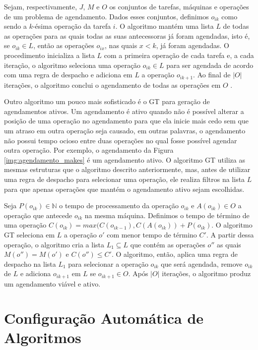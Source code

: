 Sejam, respectivamente, $J$, $M$ e $O$ os conjuntos de tarefas, máquinas e operações de um problema de agendamento. Dados esses conjuntos, definimos $o_{ik}$ como sendo a $k$-ésima operação da tarefa $i$. O algoritmo mantém uma lista $L$ de todas as operações para as quais todas as suas antecessoras já foram agendadas, isto é, se $o_{ik} \in L$, então as operações $o_{ix}$, nas quais $x < k$, já foram agendadas. O procedimento inicializa a lista $L$ com a primeira operação de cada tarefa e, a cada iteração, o algoritmo seleciona uma operação $o_{ik} \in L$ para ser agendada de acordo com uma regra de despacho e adiciona em $L$ a operação $o_{ik+1}$. Ao final de $|O|$ iterações, o algoritmo conclui o agendamento de todas as operações em $O$ \citep{pinedo2008}.

Outro algoritmo um pouco mais sofisticado é o \ac{GT} \citep{giffler1960algorithms} para geração de agendamentos ativos. Um agendamento é ativo quando não é possível alterar a posição de uma operação no agendamento para que ela inicie mais cedo sem que um atraso em outra operação seja causado, em outras palavras, o agendamento não possui tempo ocioso entre duas operações no qual fosse possível agendar outra operação. Por exemplo, o agendamento da Figura \ref{img:agendamento_makes} é um agendamento ativo. O algoritmo \ac{GT} utiliza as mesmas estruturas que o algoritmo descrito anteriormente, mas, antes de utilizar uma regra de despacho para selecionar uma operação, ele realiza filtros na lista $L$ para que apenas operações que mantém o agendamento ativo sejam escolhidas.

Seja $P(o_{ik}) \in \mathbb{N}$ o tempo de processamento da operação $o_{ik}$ e $A(o_{ik}) \in O$ a operação que antecede $o_{ik}$ na mesma máquina. Definimos o tempo de término de uma operação $C(o_{ik}) = max(C(o_{ik-1}), C(A(o_{ik})) + P(o_{ik})$. O algoritmo \ac{GT} seleciona em $L$ a operação $o'$ com menor tempo de término $C'$. A partir dessa operação, o algoritmo cria a lista $L_1 \subseteq L$ que contém as operações $o''$ as quais $M(o'') = M(o')$ e $C(o'') \le C'$. O algoritmo, então, aplica uma regra de despacho na lista $L_1$ para selecionar a operação $o_{ik}$ que será agendada, remove $o_{ik}$ de $L$ e adiciona $o_{ik+1}$ em $L$ se $o_{ik+1} \in O$. Após $|O|$ iterações, o algoritmo produz um agendamento viável e ativo.

\section{Configuração Automática de Algoritmos}

